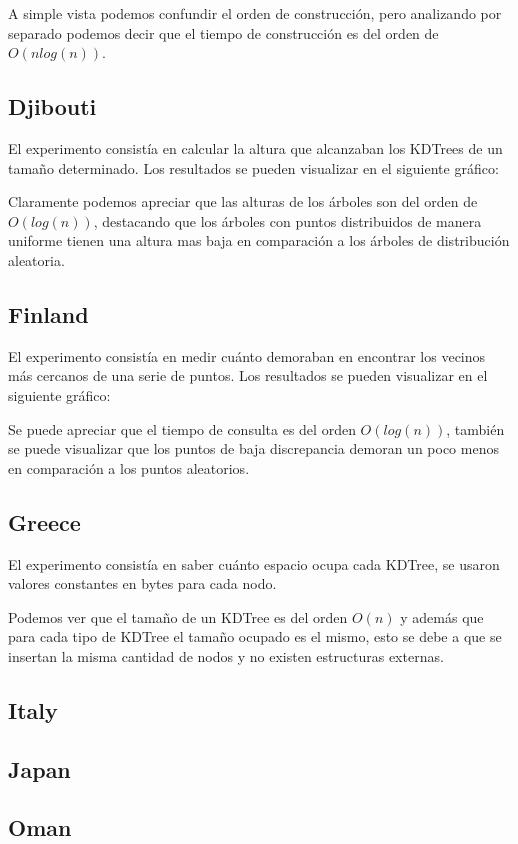 \documentclass[12pt,letterpaper, margin = 3cm]{article}
\begin{document}
A simple vista podemos confundir el orden de construcción, pero analizando por separado podemos decir que el tiempo de construcción es del orden de $O(n log(n))$.


\newpage
\subsection{Djibouti}
El experimento consistía en calcular la altura que alcanzaban los KDTrees de un tamaño determinado. Los resultados se pueden visualizar en el siguiente gráfico:

Claramente podemos apreciar que las alturas de los árboles son del orden de $O(log(n))$, destacando que los árboles con puntos distribuidos de manera uniforme tienen una altura mas baja en comparación a los árboles de distribución aleatoria.
\newpage
\subsection{Finland}
El experimento consistía en medir cuánto demoraban en encontrar los vecinos más cercanos de una serie de puntos. Los resultados se pueden visualizar en el siguiente gráfico:


Se puede apreciar que el tiempo de consulta es del orden $O(log(n))$, también se puede visualizar que los puntos de baja discrepancia demoran un poco menos en comparación a los puntos aleatorios.

\newpage
\subsection{Greece} 
El experimento consistía en saber cuánto espacio ocupa cada KDTree, se usaron valores constantes en bytes para cada nodo. 

Podemos ver que el tamaño de un KDTree es del orden $O(n)$ y además que para cada tipo de KDTree el tamaño ocupado es el mismo, esto se debe a que se insertan la misma cantidad de nodos y no existen estructuras externas.

\subsection{Italy}
\subsection{Japan}
\subsection{Oman}
\end{document}
